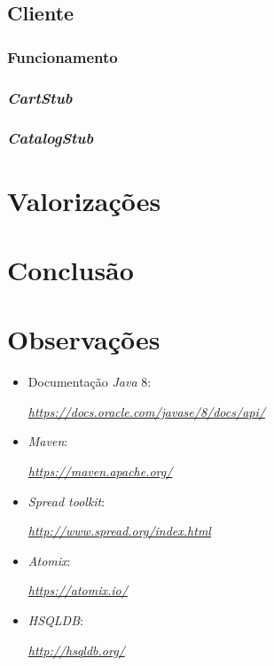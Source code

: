 \documentclass[a4paper]{report}
\begin{document}
{	\section{Cliente} \label{sec:Client}
		\subsection{Funcionamento} \label{subsec:ClientWorking}
		\subsection{\textit{CartStub}} \label{subsec:ClientCartStub}
		\subsection{\textit{CatalogStub}} \label{subsec:ClientCatalogStub}
}

\chapter{Valorizações} \label{ch:ProblemDescription}
\large{
	
}

\chapter{Conclusão} \label{ch:Conclusion}
\large{
	
}

\appendix
\chapter{Observações} \label{ch:Observations}
\begin{itemize}
    \item Documentação \textit{Java} 8:
    \par \textit{\url{https://docs.oracle.com/javase/8/docs/api/}}
	\item \textit{Maven}:
	\par \textit{\url{https://maven.apache.org/}}
	\item \textit{Spread toolkit}:
	\par \textit{\url{http://www.spread.org/index.html}}
	\item \textit{Atomix}:
	\par \textit{\url{https://atomix.io/}}
	\item \textit{HSQLDB}:
	\par \textit{\url{http://hsqldb.org/}}
\end{itemize}
\end{document}
